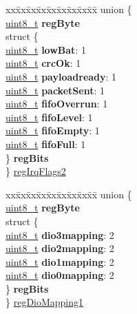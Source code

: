 \begin{DoxyCompactItemize}
\begin{tabbing}
\end{tabbing}\item 
\begin{tabbing}
xx\=xx\=xx\=xx\=xx\=xx\=xx\=xx\=xx\=\kill
union \{\\
\>\hyperlink{vl53l0x__types_8h_aba7bc1797add20fe3efdf37ced1182c5}{uint8\_t} {\bfseries regByte}\\
\>struct \{\\
\>\>\hyperlink{vl53l0x__types_8h_aba7bc1797add20fe3efdf37ced1182c5}{uint8\_t} {\bfseries lowBat}: 1\\
\>\>\hyperlink{vl53l0x__types_8h_aba7bc1797add20fe3efdf37ced1182c5}{uint8\_t} {\bfseries crcOk}: 1\\
\>\>\hyperlink{vl53l0x__types_8h_aba7bc1797add20fe3efdf37ced1182c5}{uint8\_t} {\bfseries payloadready}: 1\\
\>\>\hyperlink{vl53l0x__types_8h_aba7bc1797add20fe3efdf37ced1182c5}{uint8\_t} {\bfseries packetSent}: 1\\
\>\>\hyperlink{vl53l0x__types_8h_aba7bc1797add20fe3efdf37ced1182c5}{uint8\_t} {\bfseries fifoOverrun}: 1\\
\>\>\hyperlink{vl53l0x__types_8h_aba7bc1797add20fe3efdf37ced1182c5}{uint8\_t} {\bfseries fifoLevel}: 1\\
\>\>\hyperlink{vl53l0x__types_8h_aba7bc1797add20fe3efdf37ced1182c5}{uint8\_t} {\bfseries fifoEmpty}: 1\\
\>\>\hyperlink{vl53l0x__types_8h_aba7bc1797add20fe3efdf37ced1182c5}{uint8\_t} {\bfseries fifoFull}: 1\\
\>\} {\bfseries regBits}\\
\} \hyperlink{structFSK__Register__Map_afbb4012b6fad4073630e742436a58937}{regIrqFlags2}\\

\end{tabbing}\item 
\begin{tabbing}
xx\=xx\=xx\=xx\=xx\=xx\=xx\=xx\=xx\=\kill
union \{\\
\>\hyperlink{vl53l0x__types_8h_aba7bc1797add20fe3efdf37ced1182c5}{uint8\_t} {\bfseries regByte}\\
\>struct \{\\
\>\>\hyperlink{vl53l0x__types_8h_aba7bc1797add20fe3efdf37ced1182c5}{uint8\_t} {\bfseries dio3mapping}: 2\\
\>\>\hyperlink{vl53l0x__types_8h_aba7bc1797add20fe3efdf37ced1182c5}{uint8\_t} {\bfseries dio2mapping}: 2\\
\>\>\hyperlink{vl53l0x__types_8h_aba7bc1797add20fe3efdf37ced1182c5}{uint8\_t} {\bfseries dio1mapping}: 2\\
\>\>\hyperlink{vl53l0x__types_8h_aba7bc1797add20fe3efdf37ced1182c5}{uint8\_t} {\bfseries dio0mapping}: 2\\
\>\} {\bfseries regBits}\\
\} \hyperlink{structFSK__Register__Map_a1bad09e60487d56039f110bde5bb51be}{regDioMapping1}\\


\end{tabbing}
\end{DoxyCompactItemize}
